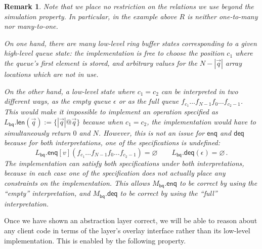 \documentclass[11pt,oneside]{book}
\newtheorem{remark}[theorem]{Remark}
\theoremstyle{definition}
\newcommand{\kw}[1]{\ensuremath{ \mathsf{#1} }}
\begin{document}
\begin{remark} %
Note that we place no restriction
on the relations we use
beyond the simulation property.
In particular, in the example above
$R$ is neither one-to-many nor many-to-one.

On one hand,
there are many low-level ring buffer states corresponding to
a given high-level queue state:
the implementation is free to choose the position $c_1$
where the queue's first element is stored,
and arbitrary values for the $N - |\vec{q}|$
array locations which are not in use.

On the other hand,
a low-level state where $c_1 = c_2$
can be interpreted in two different ways,
as the empty queue $\epsilon$ or
as the full queue $f_{c_1} \ldots f_{N-1} f_0 \ldots f_{c_2 - 1}$.
This would make it impossible to implement
an operation specified as
$L_\kw{bq}.\kw{len}(\vec{q}) := \{ |\vec{q}|@\vec{q} \}$
because
when $c_1 = c_2$,
the implementation
would have to simultaneously
return $0$ and $N$.
However,
this is not an issue for $\kw{enq}$ and $\kw{deq}$ because
for both interpretations,
one of the specifications is undefined:
\[
  L_\kw{bq}.\kw{enq}[v](f_{c_1} \ldots f_{N-1} f_0 \ldots f_{c_2 - 1})
  =
  \varnothing
  \qquad
  L_\kw{bq}.\kw{deq}(\epsilon)
  =
  \varnothing
  \,.
\]
The implementation can satisfy both specifications
under both interpretations,
because in each case one of
the specification does not actually place
any constraints on the implementation.
This allows
$M_\kw{bq}.\kw{enq}$ to be correct
by using the ``empty'' interpretation, and
$M_\kw{bq}.\kw{deq}$ to be correct
by using the ``full'' interpretation.
\end{remark}

Once we have shown an abstraction layer correct,
we will be able to reason about any client code
in terms of the layer's overlay interface
rather than its low-level implementation.
This is enabled by the following property.
\end{document}
